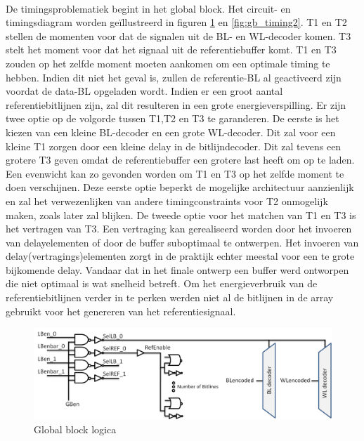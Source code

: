 \paragraph{}
De timingsproblematiek begint in het global block. Het circuit- en timingsdiagram worden geïllustreerd in figuren \ref{fig:gb_timing1} en \ref{fig:gb_timing2}. T1 en T2 stellen de momenten voor dat de signalen uit de BL- en WL-decoder komen. T3 stelt het moment voor dat het signaal uit de referentiebuffer komt. T1 en T3 zouden op het zelfde moment moeten aankomen om een optimale timing te hebben. Indien dit niet het geval is, zullen de referentie-BL al geactiveerd zijn voordat de data-BL opgeladen wordt. Indien er een groot aantal referentiebitlijnen zijn, zal dit resulteren in een grote energieverspilling. Er zijn twee optie op de volgorde tussen T1,T2 en T3 te garanderen. De eerste is het kiezen van een kleine BL-decoder en een grote WL-decoder. Dit zal voor een kleine T1 zorgen door een kleine delay in de bitlijndecoder. Dit zal tevens een grotere T3 geven omdat de referentiebuffer een grotere last heeft om op te laden. Een evenwicht kan zo gevonden worden om T1 en T3 op het zelfde moment te doen verschijnen. Deze eerste optie beperkt de mogelijke architectuur aanzienlijk en zal het verwezenlijken van andere timingconstraints voor T2 onmogelijk maken, zoals later zal blijken. De tweede optie voor het matchen van T1 en T3 is het vertragen van T3. Een vertraging kan gerealiseerd worden door het invoeren van delayelementen of door de buffer suboptimaal te ontwerpen. Het invoeren van delay(vertragings)elementen zorgt in de praktijk echter meestal voor een te grote bijkomende delay. Vandaar dat in het finale ontwerp een buffer werd ontworpen die niet optimaal is wat snelheid betreft. Om het energieverbruik van de referentiebitlijnen verder in te perken werden niet al de bitlijnen in de array gebruikt voor het genereren van het referentiesignaal.

\begin{figure}[!ht]
  \centering
  \includegraphics[scale=0.6]{../fig/hfdstk-timing-gb1.png}
  \caption[Global block:logica]{Global block logica}
  \label{fig:gb_timing1}
\end{figure}

